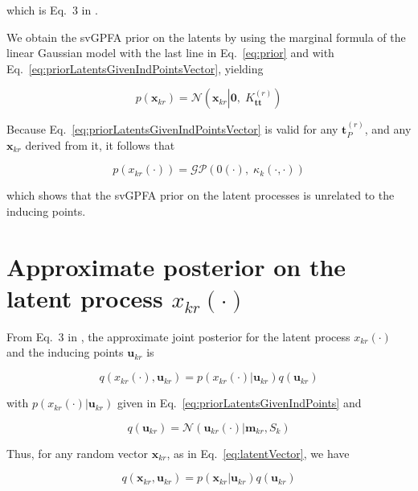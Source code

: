 \documentclass[12pt]{article}
\begin{document}
\noindent which is Eq.~3 in \citet{dunckerAndSahani18}.

We obtain the svGPFA prior on the latents by using the marginal formula of the
linear Gaussian model \citep[][Eq.~2.115]{bishop06} with the last line in
Eq.~\ref{eq:prior} and with Eq.~\ref{eq:priorLatentsGivenIndPointsVector},
yielding

\begin{equation}
    p(\mathbf{x}_{kr})=\mathcal{N}\left(\mathbf{x}_{kr}\left|\mathbf{0},\;K_\mathbf{tt}^{(r)}\right.\right)
    \label{eq:latentsPriorVector}
\end{equation}

Because Eq.~\ref{eq:priorLatentsGivenIndPointsVector} is valid for any
$\mathbf{t}_P^{(r)}$, and any $\mathbf{x}_{kr}$ derived from it, it follows that

\begin{equation*}
    p(x_{kr}(\cdot))=\mathcal{GP}\left(0(\cdot),\;\kappa_k(\cdot,\cdot)\right)
\end{equation*}

\noindent which shows that the svGPFA prior on the latent processes is
unrelated to the inducing points.

\section{Approximate posterior on the latent process $x_{kr}(\cdot)$}

From Eq.~3 in \citet[][supplementary]{dunckerAndSahani18}, the approximate joint
posterior for the latent process $x_{kr}(\cdot)$ and the inducing points
$\mathbf{u}_{kr}$ is

\begin{equation}
    q(x_{kr}(\cdot),\mathbf{u}_{kr})=p(x_{kr}(\cdot)|\mathbf{u}_{kr})q(\mathbf{u}_{kr})
\end{equation}

\noindent with $p(x_{kr}(\cdot)|\mathbf{u}_{kr})$ given in Eq.~\ref{eq:priorLatentsGivenIndPoints} and

\begin{equation}
    q(\mathbf{u}_{kr})=\mathcal{N}(\mathbf{u}_{kr}(\cdot)|\mathbf{m}_{kr}, S_k)
    \label{eq:qu}
\end{equation}

Thus, for any random vector $\mathbf{x}_{kr}$, as in Eq.~\ref{eq:latentVector},
we have

\begin{equation}
    q(\mathbf{x}_{kr},\mathbf{u}_{kr})=p(\mathbf{x}_{kr}|\mathbf{u}_{kr})q(\mathbf{u}_{kr})
\end{equation}
\end{document}
